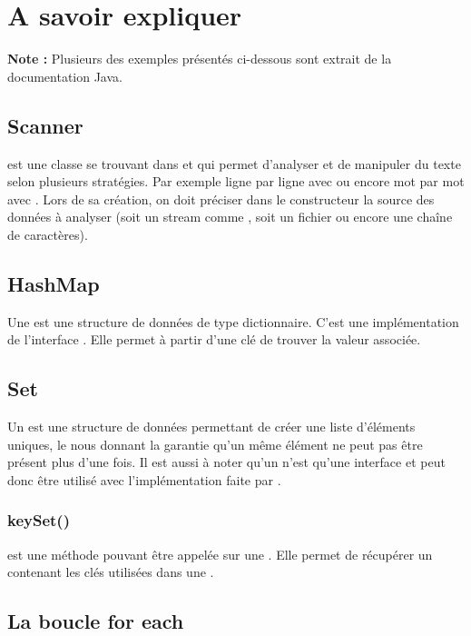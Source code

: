 \chapter{A savoir expliquer}

\textbf{Note :} Plusieurs des exemples présentés ci-dessous sont extrait de la documentation Java. 
 
\section{Scanner}
 
 est une classe se trouvant dans  et qui permet d'analyser et de manipuler du texte selon plusieurs stratégies. Par exemple ligne par ligne avec  ou encore mot par mot avec . Lors de sa création, on doit préciser dans le constructeur la source des données à analyser (soit un stream comme , soit un fichier ou encore une chaîne de caractères).

\section{HashMap}

Une  est une structure de données de type dictionnaire. C'est une implémentation de l'interface . Elle permet à partir d'une clé de trouver la valeur associée.

\section{Set}

Un  est une structure de données permettant de créer une liste d'éléments uniques, le  nous donnant la garantie qu'un même élément ne peut pas être présent plus d'une fois. Il est aussi à noter qu'un  n'est qu'une interface et peut donc être utilisé avec l'implémentation faite par .

\subsection{keySet()}

 est une méthode pouvant être appelée sur une . Elle permet de récupérer un  contenant les clés utilisées dans une .

\section{La boucle for each}

